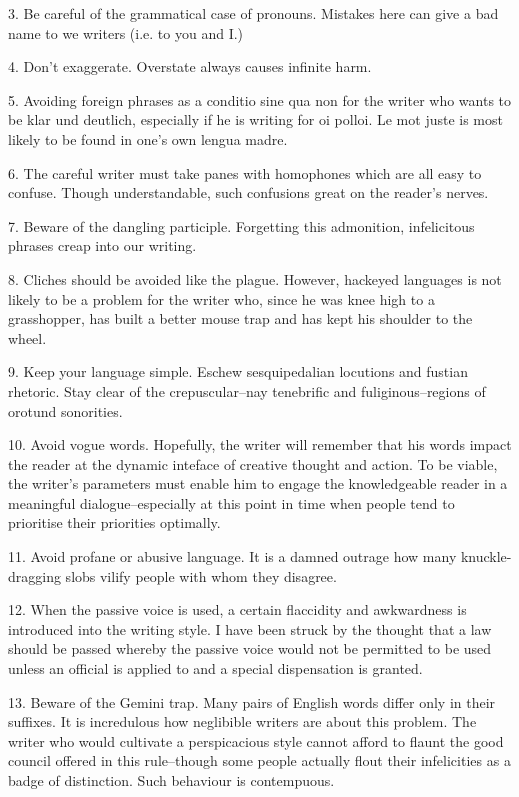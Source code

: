 \documentclass[a4paper]{article}
\begin{document}
3. Be careful of the grammatical case of pronouns.  Mistakes here can give a bad name to we writers (i.e. to you and I.)

4. Don't exaggerate.  Overstate always causes infinite harm.

5. Avoiding foreign phrases as a conditio sine qua non for the writer who wants to be klar und deutlich, especially if he is writing for oi polloi.  Le mot juste is most likely to be found in one's own lengua madre.  

6. The careful writer must take panes with homophones which are all easy to confuse.  Though understandable, such confusions great on the reader's nerves.

7. Beware of the dangling participle.  Forgetting this admonition, infelicitous phrases creap into our writing.

8.  Cliches should be avoided like the plague.  However, hackeyed languages is not likely to be a problem for the writer who, since he was knee high to a grasshopper, has built a better mouse trap and has kept his shoulder to the wheel.

9.  Keep your language simple.  Eschew sesquipedalian locutions and fustian rhetoric.  Stay clear of the crepuscular--nay tenebrific and fuliginous--regions of orotund sonorities.

10.  Avoid vogue words.  Hopefully, the writer will remember that his words impact the reader at the dynamic inteface of creative thought and action.  To be viable, the writer's parameters must enable him to engage the knowledgeable reader in a meaningful dialogue--especially at this point in time when people tend to prioritise their priorities optimally.

11. Avoid profane or abusive language.  It is a damned outrage how many knuckle-dragging slobs vilify people with whom they disagree.

12.  When the passive voice is used, a certain flaccidity and awkwardness is introduced into the writing style.  I have been struck by the thought that a law should be passed whereby the passive voice would not be permitted to be used unless an official is applied to and a special dispensation is granted.

13.  Beware of the Gemini trap.  Many pairs of English words differ only in their suffixes.  It is incredulous how neglibible writers are about this problem.  The writer who would cultivate a perspicacious style cannot afford to flaunt the good council  offered in this rule--though some people actually flout their infelicities as a badge of distinction.  Such behaviour is contempuous.
\end{document}
